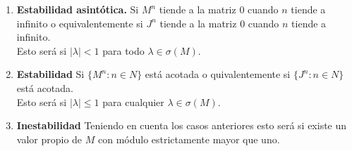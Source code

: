 \documentclass[a4paper , 14pt, spanish ]{article}
\begin{document}
\begin{enumerate}

\item \textbf{Estabilidad asintótica.} Si $M^n$ tiende a la matriz $0$ cuando $n$ tiende a infinito o equivalentemente si  $J^n$ tiende
  a la matriz  $0$ cuando $n$ tiende a infinito. \\
  Esto será si $| \lambda | < 1$  para todo $\lambda \in \sigma (M).$

  \item \textbf{Estabilidad} Si $\{ M^n : n \in N \}$ está acotada o quivalentemente si  $\{ J^n : n \in N \}$ está acotada.  \\
    Esto será si $ |\lambda| \leq 1$  para cualquier $\lambda \in \sigma (M).$

  \item \textbf{ Inestabilidad} Teniendo en cuenta los casos anteriores esto será si existe un valor propio de $M$ con módulo estrictamente mayor que uno. 

  
\end{enumerate}
\end{document}
